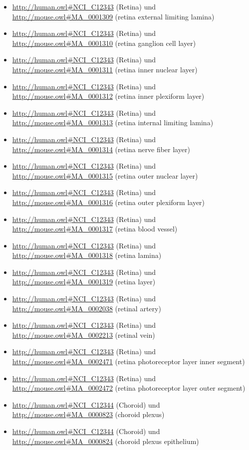 \begin{itemize}
	\item \url{http://human.owl#NCI_C12343} (Retina) und \url{http://mouse.owl#MA_0001309} (retina external limiting lamina)
	\item \url{http://human.owl#NCI_C12343} (Retina) und \url{http://mouse.owl#MA_0001310} (retina ganglion cell layer)
	\item \url{http://human.owl#NCI_C12343} (Retina) und \url{http://mouse.owl#MA_0001311} (retina inner nuclear layer)
	\item \url{http://human.owl#NCI_C12343} (Retina) und \url{http://mouse.owl#MA_0001312} (retina inner plexiform layer)
	\item \url{http://human.owl#NCI_C12343} (Retina) und \url{http://mouse.owl#MA_0001313} (retina internal limiting lamina)
	\item \url{http://human.owl#NCI_C12343} (Retina) und \url{http://mouse.owl#MA_0001314} (retina nerve fiber layer)
	\item \url{http://human.owl#NCI_C12343} (Retina) und \url{http://mouse.owl#MA_0001315} (retina outer nuclear layer)
	\item \url{http://human.owl#NCI_C12343} (Retina) und \url{http://mouse.owl#MA_0001316} (retina outer plexiform layer)
	\item \url{http://human.owl#NCI_C12343} (Retina) und \url{http://mouse.owl#MA_0001317} (retina blood vessel)
	\item \url{http://human.owl#NCI_C12343} (Retina) und \url{http://mouse.owl#MA_0001318} (retina lamina)
	\item \url{http://human.owl#NCI_C12343} (Retina) und \url{http://mouse.owl#MA_0001319} (retina layer)
	\item \url{http://human.owl#NCI_C12343} (Retina) und \url{http://mouse.owl#MA_0002038} (retinal artery)
	\item \url{http://human.owl#NCI_C12343} (Retina) und \url{http://mouse.owl#MA_0002213} (retinal vein)
	\item \url{http://human.owl#NCI_C12343} (Retina) und \url{http://mouse.owl#MA_0002471} (retina photoreceptor layer inner segment)
	\item \url{http://human.owl#NCI_C12343} (Retina) und \url{http://mouse.owl#MA_0002472} (retina photoreceptor layer outer segment)
	\item \url{http://human.owl#NCI_C12344} (Choroid) und \url{http://mouse.owl#MA_0000823} (choroid plexus)
	\item \url{http://human.owl#NCI_C12344} (Choroid) und \url{http://mouse.owl#MA_0000824} (choroid plexus epithelium)

\end{itemize}
